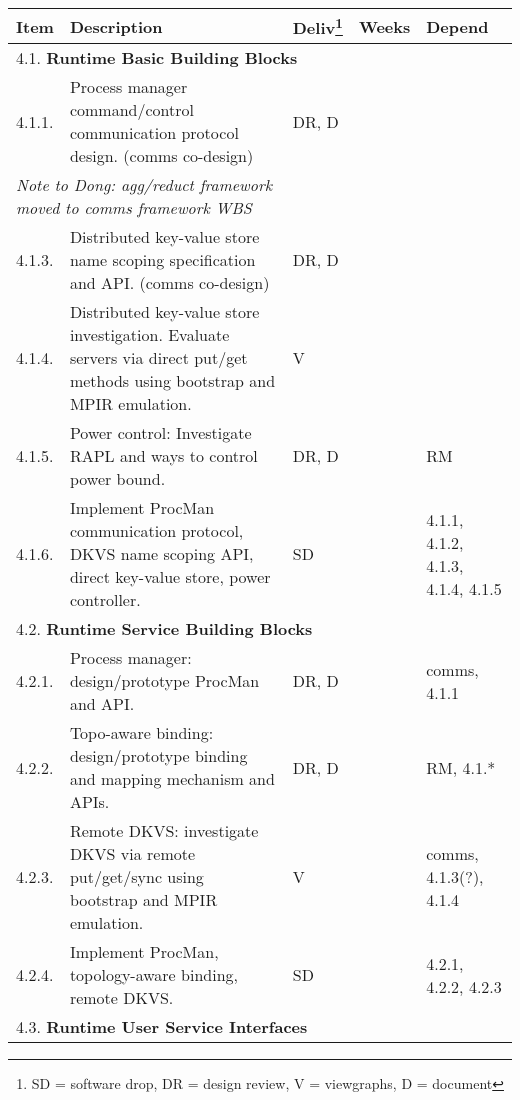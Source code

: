 \begin{longtable}{|p{1cm}|p{10.2cm}|p{1cm}|p{1cm}|p{1.8cm}|}\hline
  \textbf{Item} & \textbf{Description}
                & \textbf{Deliv}\footnote{SD = software drop,
                        DR = design review, V = viewgraphs, D = document}
                & \textbf{Weeks} & \textbf{Depend} \\
  \hline
  \hline
  \multicolumn{5}{|l|}{4.1. \textbf{Runtime Basic Building Blocks}} \\
  \hline
  4.1.1.& Process manager command/control communication protocol design.
          (comms co-design)
        & DR, D
        & 
        & \\
  \hline
  \multicolumn{2}{|l|}{\em Note to Dong: agg/reduct framework moved to comms
              framework WBS}
        &
        &
        & \\
  \hline
  4.1.3.& Distributed key-value store name scoping specification and API.
          (comms co-design)
        & DR, D
        & 
        & \\
  \hline
  4.1.4.& Distributed key-value store investigation.  Evaluate servers
          via direct put/get methods using bootstrap and MPIR emulation.
        & V
        & 
        & \\
  \hline
  4.1.5.& Power control: Investigate  RAPL and ways to control power bound.
        & DR, D
        & 
        & RM \\
  \hline
  4.1.6.& Implement ProcMan communication protocol, DKVS name scoping API,
          direct key-value store, power controller.
        & SD
        & 
        & 4.1.1, 4.1.2, 4.1.3, 4.1.4, 4.1.5 \\
  \hline
  \multicolumn{5}{|l|}{4.2. \textbf{Runtime Service Building Blocks}} \\
  \hline
  4.2.1.& Process manager: design/prototype ProcMan and API.
        & DR, D
        & 
        & comms, 4.1.1\\
  \hline
  4.2.2.& Topo-aware binding: design/prototype binding and mapping
          mechanism and APIs.
        & DR, D
        & 
        & RM, 4.1.*\\
  \hline
  4.2.3.& Remote DKVS: investigate DKVS via remote put/get/sync using
	  bootstrap and MPIR emulation.
        & V
        & 
        & comms, 4.1.3(?), 4.1.4\\
  \hline
  4.2.4.& Implement ProcMan, topology-aware binding, remote DKVS.
        & SD 
        & 
        & 4.2.1, 4.2.2, 4.2.3 \\
  \hline
  \multicolumn{5}{|l|}{4.3. \textbf{Runtime User Service Interfaces}} \\

\end{longtable}
